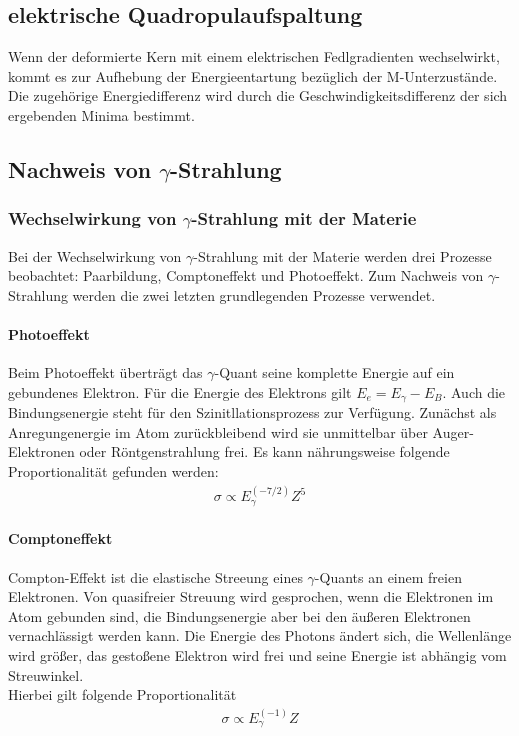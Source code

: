 \documentclass[a4paper,twoside,final]{article}
\begin{document}
\subsection{elektrische Quadropulaufspaltung}
Wenn der deformierte Kern mit einem elektrischen Fedlgradienten wechselwirkt, kommt es zur Aufhebung der Energieentartung bezüglich der M-Unterzustände. Die zugehörige Energiedifferenz wird durch die Geschwindigkeitsdifferenz der sich ergebenden Minima bestimmt.


\subsection{Nachweis von $\gamma$-Strahlung}
\subsubsection{Wechselwirkung von $\gamma$-Strahlung mit der Materie}
Bei der Wechselwirkung von $\gamma$-Strahlung mit der Materie werden drei Prozesse beobachtet: Paarbildung, Comptoneffekt und Photoeffekt. Zum Nachweis von $\gamma$-Strahlung werden die zwei letzten grundlegenden Prozesse verwendet.
\paragraph{Photoeffekt}
Beim Photoeffekt überträgt das $\gamma$-Quant seine komplette Energie auf ein gebundenes Elektron. Für die Energie des Elektrons gilt $E_e = E_\gamma - E_B$. Auch die Bindungsenergie steht für den Szinitllationsprozess zur Verfügung. Zunächst als Anregungenergie im Atom zurückbleibend wird sie unmittelbar über Auger-Elektronen oder Röntgenstrahlung frei. Es kann nährungsweise folgende Proportionalität gefunden werden:
\begin{align}
\sigma  \propto E_{\gamma} ^(-7/2) Z^5
\end{align}
\paragraph{Comptoneffekt}
Compton-Effekt ist die elastische Streeung eines $\gamma$-Quants an einem freien Elektronen. Von quasifreier Streuung wird gesprochen, wenn die Elektronen im Atom gebunden sind, die Bindungsenergie aber bei den äußeren Elektronen vernachlässigt werden kann. Die Energie des Photons ändert sich, die Wellenlänge wird größer, das gestoßene Elektron wird frei und seine Energie ist abhängig vom Streuwinkel. \\
Hierbei gilt folgende Proportionalität
\begin{align}
\sigma \propto E_{\gamma} ^(-1) Z
\end{align}
\end{document}
